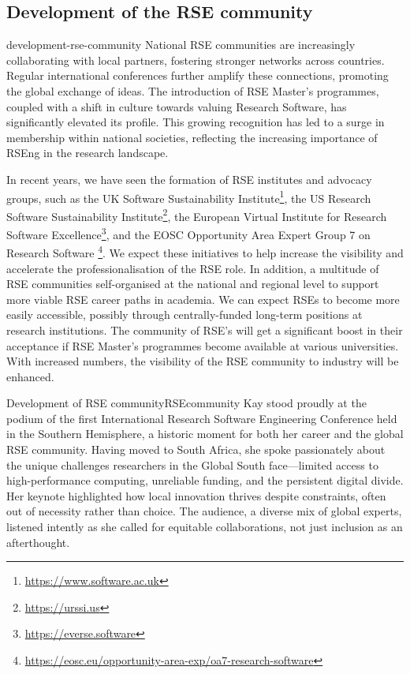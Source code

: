 \documentclass{eceasst}
\begin{document}
\subsection{Development of the RSE community}
\begin{whatis}{}{development-rse-community}
National RSE communities are increasingly collaborating with local partners, fostering stronger networks across countries. Regular international conferences further amplify these connections, promoting the global exchange of ideas. The introduction of RSE Master's programmes, coupled with a shift in culture towards valuing Research Software, has significantly elevated its profile. This growing recognition has led to a surge in membership within national societies, reflecting the increasing importance of RSEng in the research landscape.
\end{whatis}
In recent years, we have seen the formation of RSE institutes and advocacy groups, such as
the UK Software Sustainability Institute\footnote{\url{https://www.software.ac.uk}},
the US Research Software Sustainability Institute\footnote{\url{https://urssi.us}},
the European Virtual Institute for Research Software Excellence\footnote{\url{https://everse.software}},
and the EOSC Opportunity Area Expert Group 7 on Research Software%
\footnote{\url{https://eosc.eu/opportunity-area-exp/oa7-research-software}}.
We expect these initiatives to help increase the visibility and accelerate
the professionalisation%
of the RSE role.
In addition, a multitude of RSE communities self-organised at the national
and regional level to support more viable RSE career paths in academia.
We can expect RSEs to become more easily accessible, possibly through centrally-funded long-term positions at research institutions.
The community of RSE's will get a significant boost in their acceptance if RSE Master's programmes
become available at various universities.
With increased numbers, the visibility of the RSE community to industry will be enhanced.
\begin{story}{Development of RSE community}{RSEcommunity}
Kay stood proudly at the podium of the first International Research Software Engineering Conference held in the Southern Hemisphere, a historic moment for both her career and the global RSE community. Having moved to South Africa, she spoke passionately about the unique challenges researchers in the Global South face—limited access to high-performance computing, unreliable funding, and the persistent digital divide. Her keynote highlighted how local innovation thrives despite constraints, often out of necessity rather than choice. The audience, a diverse mix of global experts, listened intently as she called for equitable collaborations, not just inclusion as an afterthought.
\end{story}
\end{document}
